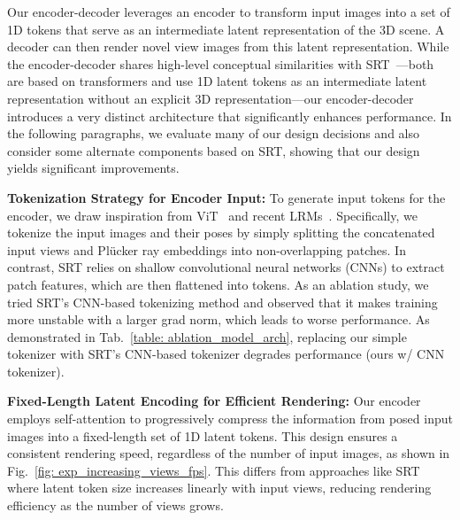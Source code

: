 Our encoder-decoder \paperName{} leverages an encoder to transform input images into a set of 1D tokens that serve as an intermediate latent representation of the 3D scene. 
A decoder can then render novel view images from this latent representation. While the encoder-decoder \paperName{} shares high-level conceptual similarities with SRT~\citep{sajjadi2022srt}---both are based on transformers and use 1D latent tokens as an intermediate latent representation without an explicit 3D representation---our encoder-decoder \paperName{} introduces a very distinct architecture that significantly enhances performance. In the following paragraphs, we evaluate many of our design decisions and also consider some alternate components based on SRT, showing that our design yields significant improvements.

\textbf{Tokenization Strategy for Encoder Input:} To generate input tokens for the encoder, we draw inspiration from ViT~\citep{dosovitskiy2020image} and recent LRMs~\citep{wei2024meshlrm,zhang2024gslrmlargereconstructionmodel}. 
Specifically, we tokenize the input images and their poses by simply splitting the concatenated input views and Plücker ray embeddings into non-overlapping patches. In contrast, SRT relies on shallow convolutional neural networks (CNNs) to extract patch features, which are then flattened into tokens. As an ablation study, we tried SRT's CNN-based tokenizing method and observed that it makes training more unstable with a larger grad norm, which leads to worse performance. As demonstrated in Tab.~\ref{table: ablation_model_arch}, replacing our simple tokenizer with SRT's CNN-based tokenizer degrades performance (ours w/ CNN tokenizer). 

\textbf{Fixed-Length Latent Encoding for Efficient Rendering:} Our encoder employs self-attention to progressively compress the information from posed input images into a fixed-length set of 1D latent tokens. This design ensures a consistent rendering speed, regardless of the number of input images, as shown in Fig.~\ref{fig: exp_increasing_views_fps}. This differs from approaches like SRT where latent token size increases linearly with input views, reducing rendering efficiency as the number of views grows.

